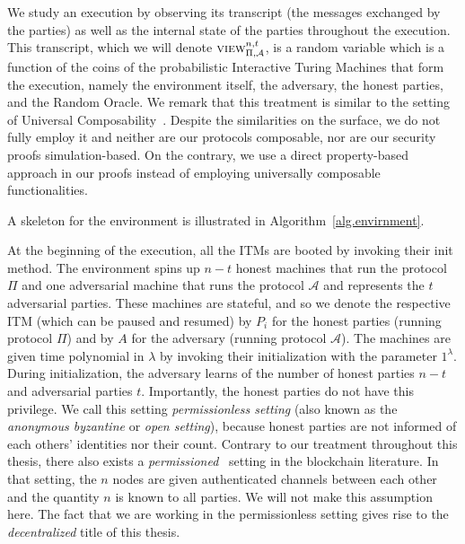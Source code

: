 We study an execution by observing its transcript (the messages exchanged by the
parties) as well as the internal state of the parties throughout the execution.
This transcript, which we will denote $\textsc{view}_{\Pi,\mathcal{A}}^{n,t}$, is a
random variable which is a function of the coins of the probabilistic
Interactive Turing Machines that form the execution, namely the environment
itself, the adversary, the honest parties, and the Random Oracle. We remark that
this treatment is similar to the setting of Universal Composability~\cite{uc}.
Despite the similarities on the surface, we do not fully employ it and neither
are our protocols composable, nor are our security proofs simulation-based. On
the contrary, we use a direct property-based approach in our proofs instead of
employing universally composable functionalities.

A skeleton for the environment is illustrated in Algorithm~\ref{alg.envirnment}.



At the beginning of the execution, all the ITMs are booted by invoking their
\textsf{init} method. The environment spins up $n - t$ honest machines that run
the protocol $\Pi$ and one adversarial machine that runs the protocol
$\mathcal{A}$ and represents the $t$ adversarial parties. These machines are
stateful, and so we denote the respective ITM (which can be paused and resumed)
by $P_i$ for the honest parties (running protocol $\Pi$) and by $A$ for the
adversary (running protocol $\mathcal{A}$). The machines are given time
polynomial in $\lambda$ by invoking their initialization with the parameter
$1^\lambda$. During initialization, the adversary
learns of the number of honest parties $n - t$ and adversarial parties $t$.
Importantly, the honest parties do not have this privilege. We
call this setting \emph{permissionless setting} (also
known as the \emph{anonymous byzantine} or \emph{open setting}), because honest
parties are not informed of each others' identities nor their count. Contrary to
our treatment throughout this thesis, there also exists a
\emph{permissioned}~\cite{consensus-sok} setting in the blockchain literature.
In that setting, the $n$ nodes are given authenticated channels between each
other and the quantity $n$ is known to all parties. We will not make this
assumption here. The fact that we are working in the permissionless setting
gives rise to the \emph{decentralized} title of this
thesis.

